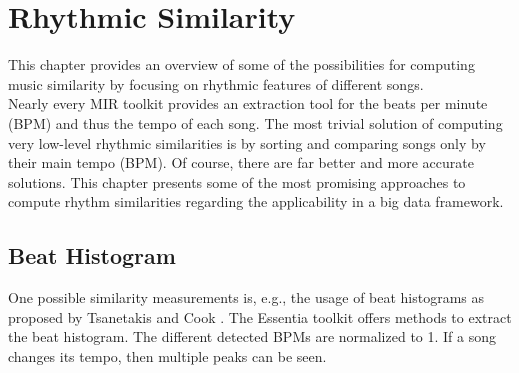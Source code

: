\section{Rhythmic Similarity}\label{rhythmsimc}

This chapter provides an overview of some of the possibilities for computing music similarity by focusing on rhythmic features of different songs. \\
Nearly every MIR toolkit provides an extraction tool for the beats per minute (BPM) and thus the tempo of each song. The most trivial solution of computing very low-level rhythmic similarities is by sorting and comparing songs only by their main tempo (BPM). Of course, there are far better and more accurate solutions.
This chapter presents some of the most promising approaches to compute rhythm similarities regarding the applicability in a big data framework.\\

\subsection{Beat Histogram}\label{beathist}

One possible similarity measurements is, e.g., the usage of beat histograms as proposed by Tsanetakis and Cook \cite{rhythm3}. The Essentia toolkit offers methods to extract the beat histogram. The different detected BPMs are normalized to 1. If a song changes its tempo, then multiple peaks can be seen.\\ 

